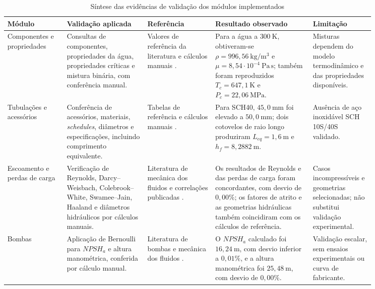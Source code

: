 \begin{table}[H]
    \centering
    \caption{Síntese das evidências de validação dos módulos implementados}
    \label{tab:sintese-validacao-modulos}
    \footnotesize
    \renewcommand{\arraystretch}{1.2}
    \begin{tabular}{|>{\raggedright\arraybackslash}p{0.14\linewidth}|>{\raggedright\arraybackslash}p{0.19\linewidth}|>{\raggedright\arraybackslash}p{0.16\linewidth}|>{\raggedright\arraybackslash}p{0.23\linewidth}|>{\raggedright\arraybackslash}p{0.14\linewidth}|}
        \hline
        \textbf{Módulo} & \textbf{Validação aplicada} & \textbf{Referência} & \textbf{Resultado observado} & \textbf{Limitação} \\
        \hline
        Componentes e propriedades & Consultas de componentes, propriedades da água, propriedades críticas e mistura binária, com conferência manual. & Valores de referência da literatura e cálculos manuais \cite{smith2018,poling2001}. & Para a água a $300\ \mathrm{K}$, obtiveram-se $\rho=996{,}56\ \mathrm{kg/m^3}$ e $\mu=8{,}54\cdot10^{-4}\ \mathrm{Pa\,s}$; também foram reproduzidos $T_c=647{,}1\ \mathrm{K}$ e $P_c=22{,}06\ \mathrm{MPa}$. & Misturas dependem do modelo termodinâmico e das propriedades disponíveis. \\
        \hline
        Tubulações e acessórios & Conferência de acessórios, materiais, \textit{schedules}, diâmetros e especificações, incluindo comprimento equivalente. & Tabelas de referência e cálculos manuais \cite{perry2007}. & Para SCH40, $45{,}0\ \mathrm{mm}$ foi elevado a $50{,}0\ \mathrm{mm}$; dois cotovelos de raio longo produziram $L_{eq}=1{,}6\ \mathrm{m}$ e $h_f=8{,}2882\ \mathrm{m}$. & Ausência de aço inoxidável SCH 10S/40S validado. \\
        \hline
        Escoamento e perdas de carga & Verificação de Reynolds, Darcy--Weisbach, Colebrook--White, Swamee--Jain, Haaland e diâmetros hidráulicos por cálculos manuais. & Literatura de mecânica dos fluidos e correlações publicadas \cite{white2018,colebrook1939,swamee1976,haaland1983}. & Os resultados de Reynolds e das perdas de carga foram concordantes, com desvio de $0{,}00\%$; os fatores de atrito e as geometrias hidráulicas também coincidiram com os cálculos de referência. & Casos incompressíveis e geometrias selecionadas; não substitui validação experimental. \\
        \hline
        Bombas & Aplicação de Bernoulli para $NPSH_a$ e altura manométrica, conferida por cálculo manual. & Literatura de bombas e mecânica dos fluidos \cite{fox2011,karassik2008}. & O $NPSH_a$ calculado foi $16{,}24\ \mathrm{m}$, com desvio inferior a $0{,}01\%$, e a altura manométrica foi $25{,}48\ \mathrm{m}$, com desvio de $0{,}00\%$. & Validação escalar, sem ensaios experimentais ou curva de fabricante. \\

\end{tabular}
\end{table}
